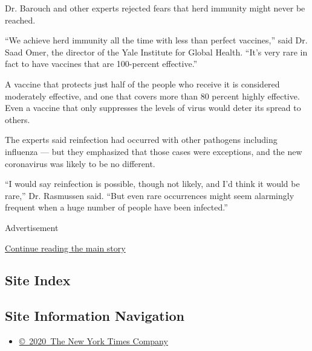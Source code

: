 Dr. Barouch and other experts rejected fears that herd immunity might
never be reached.

``We achieve herd immunity all the time with less than perfect
vaccines,'' said Dr. Saad Omer, the director of the Yale Institute for
Global Health. ``It's very rare in fact to have vaccines that are
100-percent effective.''

A vaccine that protects just half of the people who receive it is
considered moderately effective, and one that covers more than 80
percent highly effective. Even a vaccine that only suppresses the levels
of virus would deter its spread to others.

The experts said reinfection had occurred with other pathogens including
influenza --- but they emphasized that those cases were exceptions, and
the new coronavirus was likely to be no different.

``I would say reinfection is possible, though not likely, and I'd think
it would be rare,'' Dr. Rasmussen said. ``But even rare occurrences
might seem alarmingly frequent when a huge number of people have been
infected.''

Advertisement

\protect\hyperlink{after-bottom}{Continue reading the main story}

\hypertarget{site-index}{%
\subsection{Site Index}\label{site-index}}

\hypertarget{site-information-navigation}{%
\subsection{Site Information
Navigation}\label{site-information-navigation}}

\begin{itemize}
\tightlist
\item
  \href{https://help.nytimes3xbfgragh.onion/hc/en-us/articles/115014792127-Copyright-notice}{©~2020~The
  New York Times Company}
\end{itemize}

